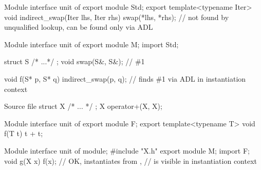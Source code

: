 \pnum
\begin{example}
\begin{codeblocktu}{Module interface unit of }
export module Std;
export template<typename Iter>
void indirect_swap(Iter lhs, Iter rhs)
{
  swap(*lhs, *rhs);     //  not found by unqualified lookup, can be found only via ADL
}
\end{codeblocktu}

\begin{codeblocktu}{Module interface unit of }
export module M;
import Std;

struct S { /* ...*/ };
void swap(S&, S&);      // \#1

void f(S* p, S* q)
{
  indirect_swap(p, q);  // finds \#1 via ADL in instantiation context
}
\end{codeblocktu}
\end{example}

\pnum
\begin{example}
\begin{codeblocktu}{Source file }
struct X { /* ... */ };
X operator+(X, X);
\end{codeblocktu}

\begin{codeblocktu}{Module interface unit of }
export module F;
export template<typename T>
void f(T t) {
  t + t;
}
\end{codeblocktu}

\begin{codeblocktu}{Module interface unit of }
module;
#include "X.h"
export module M;
import F;
void g(X x) {
  f(x);             // OK, instantiates  from ,
                    //  is visible in instantiation context
}
\end{codeblocktu}
\end{example}

